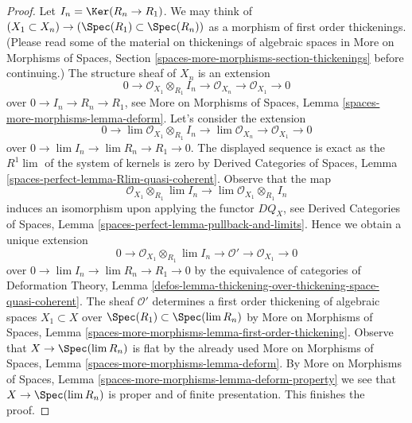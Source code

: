 \begin{proof}
\medskip\noindent
Let $I_n = \Ker(R_n \to R_1)$. We may think of
$(X_1 \subset X_n) \to (\Spec(R_1) \subset \Spec(R_n))$
as a morphism of first order thickenings. (Please read some of the material
on thickenings of algebraic spaces in More on Morphisms of Spaces, Section
\ref{spaces-more-morphisms-section-thickenings}
before continuing.) The structure sheaf of $X_n$ is an extension
$$
0 \to \mathcal{O}_{X_1} \otimes_{R_1} I_n \to
\mathcal{O}_{X_n} \to \mathcal{O}_{X_1} \to 0
$$
over $0 \to I_n \to R_n \to R_1$, see
More on Morphisms of Spaces, Lemma
\ref{spaces-more-morphisms-lemma-deform}.
Let's consider the extension
$$
0 \to \lim \mathcal{O}_{X_1} \otimes_{R_1} I_n \to
\lim \mathcal{O}_{X_n} \to \mathcal{O}_{X_1} \to 0
$$
over $0 \to \lim I_n \to \lim R_n \to R_1 \to 0$.
The displayed sequence is exact as the $R^1\lim$ of the system
of kernels is zero by Derived Categories of Spaces, Lemma
\ref{spaces-perfect-lemma-Rlim-quasi-coherent}.
Observe that the map
$$
\mathcal{O}_{X_1} \otimes_{R_1} \lim I_n \longrightarrow
\lim \mathcal{O}_{X_1} \otimes_{R_1} I_n
$$
induces an isomorphism upon applying the functor $DQ_X$, see
Derived Categories of Spaces, Lemma
\ref{spaces-perfect-lemma-pullback-and-limits}.
Hence we obtain a unique extension
$$
0 \to \mathcal{O}_{X_1} \otimes_{R_1} \lim I_n \to
\mathcal{O}' \to \mathcal{O}_{X_1} \to 0
$$
over $0 \to \lim I_n \to \lim R_n \to R_1 \to 0$
by the equivalence of categories of
Deformation Theory, Lemma
\ref{defos-lemma-thickening-over-thickening-space-quasi-coherent}.
The sheaf $\mathcal{O}'$ determines
a first order thickening of algebraic spaces $X_1 \subset X$
over $\Spec(R_1) \subset \Spec(\lim R_n)$
by More on Morphisms of Spaces, Lemma
\ref{spaces-more-morphisms-lemma-first-order-thickening}.
Observe that $X \to \Spec(\lim R_n)$ is flat by the already
used More on Morphisms of Spaces, Lemma
\ref{spaces-more-morphisms-lemma-deform}.
By More on Morphisms of Spaces, Lemma
\ref{spaces-more-morphisms-lemma-deform-property}
we see that $X \to \Spec(\lim R_n)$ is proper
and of finite presentation.
This finishes the proof.
\end{proof}


